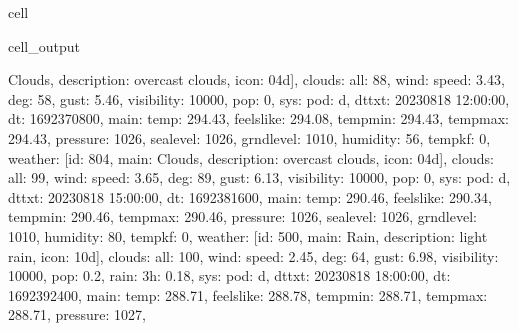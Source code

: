 \documentclass[letterpaper,10pt,english]{jupyterBook}
\begin{document}
\begin{sphinxuseclass}{cell}
\begin{sphinxVerbatimOutput}
\begin{sphinxuseclass}{cell_output}
\begin{sphinxVerbatim}[commandchars=\\\{\}]
\PYGZsq{}Clouds\PYGZsq{}, \PYGZsq{}description\PYGZsq{}: \PYGZsq{}overcast clouds\PYGZsq{}, \PYGZsq{}icon\PYGZsq{}: \PYGZsq{}04d\PYGZsq{}\PYGZcb{}], \PYGZsq{}clouds\PYGZsq{}: \PYGZob{}\PYGZsq{}all\PYGZsq{}: 88\PYGZcb{}, \PYGZsq{}wind\PYGZsq{}: \PYGZob{}\PYGZsq{}speed\PYGZsq{}: 3.43, \PYGZsq{}deg\PYGZsq{}: 58, \PYGZsq{}gust\PYGZsq{}: 5.46\PYGZcb{}, \PYGZsq{}visibility\PYGZsq{}: 10000, \PYGZsq{}pop\PYGZsq{}: 0, \PYGZsq{}sys\PYGZsq{}: \PYGZob{}\PYGZsq{}pod\PYGZsq{}: \PYGZsq{}d\PYGZsq{}\PYGZcb{}, \PYGZsq{}dt\PYGZus{}txt\PYGZsq{}: \PYGZsq{}2023\PYGZhy{}08\PYGZhy{}18 12:00:00\PYGZsq{}\PYGZcb{}, \PYGZob{}\PYGZsq{}dt\PYGZsq{}: 1692370800, \PYGZsq{}main\PYGZsq{}: \PYGZob{}\PYGZsq{}temp\PYGZsq{}: 294.43, \PYGZsq{}feels\PYGZus{}like\PYGZsq{}: 294.08, \PYGZsq{}temp\PYGZus{}min\PYGZsq{}: 294.43, \PYGZsq{}temp\PYGZus{}max\PYGZsq{}: 294.43, \PYGZsq{}pressure\PYGZsq{}: 1026, \PYGZsq{}sea\PYGZus{}level\PYGZsq{}: 1026, \PYGZsq{}grnd\PYGZus{}level\PYGZsq{}: 1010, \PYGZsq{}humidity\PYGZsq{}: 56, \PYGZsq{}temp\PYGZus{}kf\PYGZsq{}: 0\PYGZcb{}, \PYGZsq{}weather\PYGZsq{}: [\PYGZob{}\PYGZsq{}id\PYGZsq{}: 804, \PYGZsq{}main\PYGZsq{}: \PYGZsq{}Clouds\PYGZsq{}, \PYGZsq{}description\PYGZsq{}: \PYGZsq{}overcast clouds\PYGZsq{}, \PYGZsq{}icon\PYGZsq{}: \PYGZsq{}04d\PYGZsq{}\PYGZcb{}], \PYGZsq{}clouds\PYGZsq{}: \PYGZob{}\PYGZsq{}all\PYGZsq{}: 99\PYGZcb{}, \PYGZsq{}wind\PYGZsq{}: \PYGZob{}\PYGZsq{}speed\PYGZsq{}: 3.65, \PYGZsq{}deg\PYGZsq{}: 89, \PYGZsq{}gust\PYGZsq{}: 6.13\PYGZcb{}, \PYGZsq{}visibility\PYGZsq{}: 10000, \PYGZsq{}pop\PYGZsq{}: 0, \PYGZsq{}sys\PYGZsq{}: \PYGZob{}\PYGZsq{}pod\PYGZsq{}: \PYGZsq{}d\PYGZsq{}\PYGZcb{}, \PYGZsq{}dt\PYGZus{}txt\PYGZsq{}: \PYGZsq{}2023\PYGZhy{}08\PYGZhy{}18 15:00:00\PYGZsq{}\PYGZcb{}, \PYGZob{}\PYGZsq{}dt\PYGZsq{}: 1692381600, \PYGZsq{}main\PYGZsq{}: \PYGZob{}\PYGZsq{}temp\PYGZsq{}: 290.46, \PYGZsq{}feels\PYGZus{}like\PYGZsq{}: 290.34, \PYGZsq{}temp\PYGZus{}min\PYGZsq{}: 290.46, \PYGZsq{}temp\PYGZus{}max\PYGZsq{}: 290.46, \PYGZsq{}pressure\PYGZsq{}: 1026, \PYGZsq{}sea\PYGZus{}level\PYGZsq{}: 1026, \PYGZsq{}grnd\PYGZus{}level\PYGZsq{}: 1010, \PYGZsq{}humidity\PYGZsq{}: 80, \PYGZsq{}temp\PYGZus{}kf\PYGZsq{}: 0\PYGZcb{}, \PYGZsq{}weather\PYGZsq{}: [\PYGZob{}\PYGZsq{}id\PYGZsq{}: 500, \PYGZsq{}main\PYGZsq{}: \PYGZsq{}Rain\PYGZsq{}, \PYGZsq{}description\PYGZsq{}: \PYGZsq{}light rain\PYGZsq{}, \PYGZsq{}icon\PYGZsq{}: \PYGZsq{}10d\PYGZsq{}\PYGZcb{}], \PYGZsq{}clouds\PYGZsq{}: \PYGZob{}\PYGZsq{}all\PYGZsq{}: 100\PYGZcb{}, \PYGZsq{}wind\PYGZsq{}: \PYGZob{}\PYGZsq{}speed\PYGZsq{}: 2.45, \PYGZsq{}deg\PYGZsq{}: 64, \PYGZsq{}gust\PYGZsq{}: 6.98\PYGZcb{}, \PYGZsq{}visibility\PYGZsq{}: 10000, \PYGZsq{}pop\PYGZsq{}: 0.2, \PYGZsq{}rain\PYGZsq{}: \PYGZob{}\PYGZsq{}3h\PYGZsq{}: 0.18\PYGZcb{}, \PYGZsq{}sys\PYGZsq{}: \PYGZob{}\PYGZsq{}pod\PYGZsq{}: \PYGZsq{}d\PYGZsq{}\PYGZcb{}, \PYGZsq{}dt\PYGZus{}txt\PYGZsq{}: \PYGZsq{}2023\PYGZhy{}08\PYGZhy{}18 18:00:00\PYGZsq{}\PYGZcb{}, \PYGZob{}\PYGZsq{}dt\PYGZsq{}: 1692392400, \PYGZsq{}main\PYGZsq{}: \PYGZob{}\PYGZsq{}temp\PYGZsq{}: 288.71, \PYGZsq{}feels\PYGZus{}like\PYGZsq{}: 288.78, \PYGZsq{}temp\PYGZus{}min\PYGZsq{}: 288.71, \PYGZsq{}temp\PYGZus{}max\PYGZsq{}: 288.71, \PYGZsq{}pressure\PYGZsq{}: 1027, 
\end{sphinxVerbatim}
\end{sphinxuseclass}
\end{sphinxVerbatimOutput}
\end{sphinxuseclass}
\end{document}
